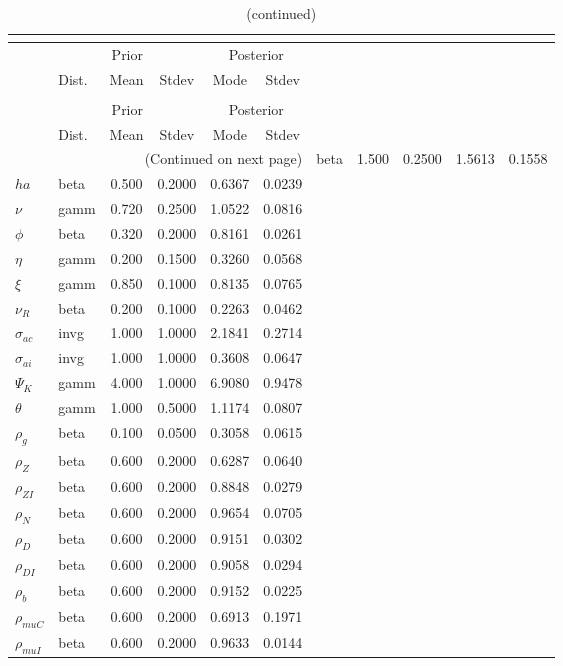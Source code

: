  
\begin{center}
\begin{longtable}{llcccc} 
\caption{Results from posterior maximization (parameters)}\\
 \label{Table:Posterior:1}\\
\toprule 
  & \multicolumn{3}{c}{Prior}  &  \multicolumn{2}{c}{Posterior} \\
  \cmidrule(r{.75em}){2-4} \cmidrule(r{.75em}){5-6}
  & Dist. & Mean  & Stdev & Mode & Stdev \\ 
\midrule \endfirsthead 
\caption{(continued)}\\
 \bottomrule 
  & \multicolumn{3}{c}{Prior}  &  \multicolumn{2}{c}{Posterior} \\
  \cmidrule(r{.75em}){2-4} \cmidrule(r{.75em}){5-6}
  & Dist. & Mean  & Stdev & Mode & Stdev \\ 
\midrule \endhead 
\bottomrule \multicolumn{6}{r}{(Continued on next page)}\endfoot 
\bottomrule\endlastfoot 
${\sigma}$ & beta &   1.500 & 0.2500 &   1.5613 &  0.1558 \\ 
${ha}$ & beta &   0.500 & 0.2000 &   0.6367 &  0.0239 \\ 
$\nu$ & gamm &   0.720 & 0.2500 &   1.0522 &  0.0816 \\ 
${\phi}$ & beta &   0.320 & 0.2000 &   0.8161 &  0.0261 \\ 
${\eta}$ & gamm &   0.200 & 0.1500 &   0.3260 &  0.0568 \\ 
$\xi$ & gamm &   0.850 & 0.1000 &   0.8135 &  0.0765 \\ 
${\nu_R}$ & beta &   0.200 & 0.1000 &   0.2263 &  0.0462 \\ 
${\sigma_{ac}}$ & invg &   1.000 & 1.0000 &   2.1841 &  0.2714 \\ 
${\sigma_{ai}}$ & invg &   1.000 & 1.0000 &   0.3608 &  0.0647 \\ 
${\Psi_{K}}$ & gamm &   4.000 & 1.0000 &   6.9080 &  0.9478 \\ 
${\theta}$ & gamm &   1.000 & 0.5000 &   1.1174 &  0.0807 \\ 
${\rho_g}$ & beta &   0.100 & 0.0500 &   0.3058 &  0.0615 \\ 
${\rho_Z}$ & beta &   0.600 & 0.2000 &   0.6287 &  0.0640 \\ 
${\rho_{ZI}}$ & beta &   0.600 & 0.2000 &   0.8848 &  0.0279 \\ 
${\rho_N}$ & beta &   0.600 & 0.2000 &   0.9654 &  0.0705 \\ 
${\rho_D}$ & beta &   0.600 & 0.2000 &   0.9151 &  0.0302 \\ 
${\rho_{DI}}$ & beta &   0.600 & 0.2000 &   0.9058 &  0.0294 \\ 
${\rho_b}$ & beta &   0.600 & 0.2000 &   0.9152 &  0.0225 \\ 
${\rho_{muC}}$ & beta &   0.600 & 0.2000 &   0.6913 &  0.1971 \\ 
${\rho_{muI}}$ & beta &   0.600 & 0.2000 &   0.9633 &  0.0144 \\ 
\end{longtable}
 \end{center}
